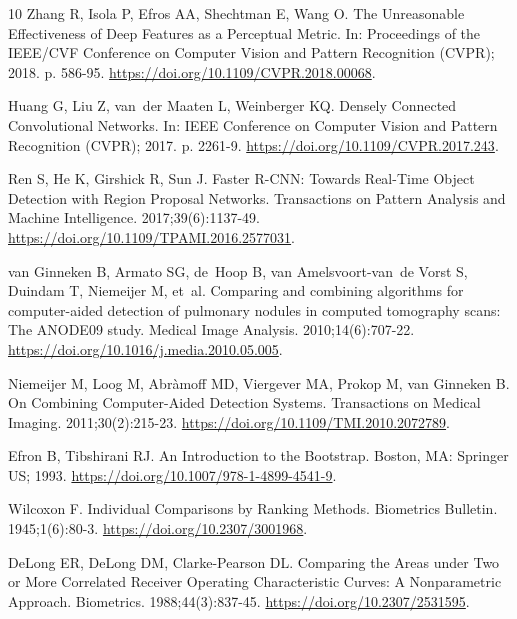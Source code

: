 \begin{thebibliography}{10}
Zhang R, Isola P, Efros AA, Shechtman E, Wang O.
\newblock The Unreasonable Effectiveness of Deep Features as a Perceptual
  Metric.
\newblock In: Proceedings of the {IEEE/CVF} Conference on Computer Vision and
  Pattern Recognition ({CVPR}); 2018. p. 586-95.
\newblock \url{https://doi.org/10.1109/CVPR.2018.00068}.

Huang G, Liu Z, van~der Maaten L, Weinberger KQ.
\newblock Densely Connected Convolutional Networks.
\newblock In: {IEEE} Conference on Computer Vision and Pattern Recognition
  ({CVPR}); 2017. p. 2261-9.
\newblock \url{https://doi.org/10.1109/CVPR.2017.243}.

Ren S, He K, Girshick R, Sun J.
\newblock Faster {R-CNN}: Towards Real-Time Object Detection with Region
  Proposal Networks.
 Transactions on Pattern Analysis and Machine Intelligence.
  2017;39(6):1137-49.
\newblock \url{https://doi.org/10.1109/TPAMI.2016.2577031}.

van Ginneken B, Armato SG, de~Hoop B, van Amelsvoort-van~de Vorst S, Duindam T,
  Niemeijer M, et~al.
\newblock Comparing and combining algorithms for computer-aided detection of
  pulmonary nodules in computed tomography scans: The {ANODE09} study.
\newblock Medical Image Analysis. 2010;14(6):707-22.
\newblock \url{https://doi.org/10.1016/j.media.2010.05.005}.

Niemeijer M, Loog M, Abr{\`a}moff MD, Viergever MA, Prokop M, van Ginneken B.
\newblock On Combining Computer-Aided Detection Systems.
 Transactions on Medical Imaging. 2011;30(2):215-23.
\newblock \url{https://doi.org/10.1109/TMI.2010.2072789}.

Efron B, Tibshirani RJ.
\newblock An Introduction to the Bootstrap.
\newblock Boston, MA: Springer US; 1993.
\newblock \url{https://doi.org/10.1007/978-1-4899-4541-9}.

Wilcoxon F.
\newblock Individual Comparisons by Ranking Methods.
\newblock Biometrics Bulletin. 1945;1(6):80-3.
\newblock \url{https://doi.org/10.2307/3001968}.

DeLong ER, DeLong DM, Clarke-Pearson DL.
\newblock Comparing the Areas under Two or More Correlated Receiver Operating
  Characteristic Curves: A Nonparametric Approach.
\newblock Biometrics. 1988;44(3):837-45.
\newblock \url{https://doi.org/10.2307/2531595}.


\end{thebibliography}
